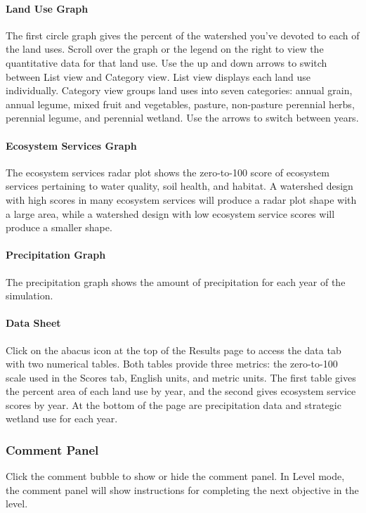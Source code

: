 \documentclass[11pt]{article}
\begin{document}
\paragraph{Land Use Graph}
The first circle graph gives the percent of the watershed you’ve devoted to each of the land uses. Scroll over the graph or the legend on the right to view the quantitative data for that land use. Use the up and down arrows to switch between List view and Category view. List view displays each land use individually. Category view groups land uses into seven categories: annual grain, annual legume, mixed fruit and vegetables, pasture, non-pasture perennial herbs, perennial legume, and perennial wetland. Use the arrows to switch between years. 

\paragraph{Ecosystem Services Graph}
The ecosystem services radar plot shows the zero-to-100 score of ecosystem services pertaining to water quality, soil health, and habitat. A watershed design with high scores in many ecosystem services will produce a radar plot shape with a large area, while a watershed design with low ecosystem service scores will produce a smaller shape. 

\paragraph{Precipitation Graph}
The precipitation graph shows the amount of precipitation for each year of the simulation. 

\paragraph{Data Sheet}
Click on the abacus icon at the top of the Results page to access the data tab with two numerical tables. Both tables provide three metrics: the zero-to-100 scale used in the Scores tab, English units, and metric units. The first table gives the percent area of each land use by year, and the second gives ecosystem service scores by year. At the bottom of the page are precipitation data and strategic wetland use for each year. 

\subsubsection{Comment Panel}
Click the comment bubble to show or hide the comment panel. In Level mode, the comment panel will show instructions for completing the next objective in the level. 
\end{document}
